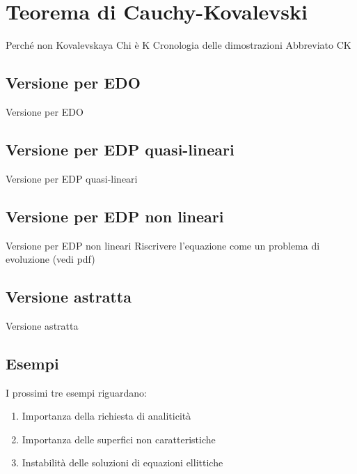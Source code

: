 \chapter{Teorema di Cauchy-Kovalevski}

Perché non Kovalevskaya
Chi è K
Cronologia delle dimostrazioni
Abbreviato CK
\section{Versione per EDO}
Versione per EDO
\section{Versione per EDP quasi-lineari}
Versione per EDP quasi-lineari
\section{Versione per EDP non lineari}
Versione per EDP non lineari
Riscrivere l'equazione come un problema di evoluzione (vedi pdf)
\section{Versione astratta}
Versione astratta
\section{Esempi}

I prossimi tre esempi riguardano:
\begin{enumerate}[1]
\item Importanza della richiesta di analiticità
\item Importanza delle superfici non caratteristiche
\item Instabilità delle soluzioni di equazioni ellittiche
\end{enumerate}

\setcounter{example}{0}


\begin{example}

\end{example}



